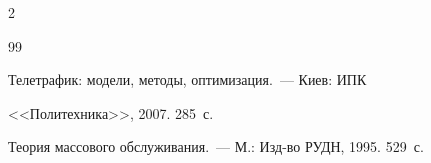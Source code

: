 \begin{multicols}{2}
{{\begin{thebibliography}{99}
  \label{end\stat}









  Телетрафик: модели, методы, оптимизация.~--- Киев: ИПК 


<<Политехника>>, 2007. 285~с.


  






  Теория массового обслуживания.~--- М.: Изд-во РУДН, 1995. 529~с.


 \end{thebibliography}


}


}


\end{multicols} 


 


 


 


 


